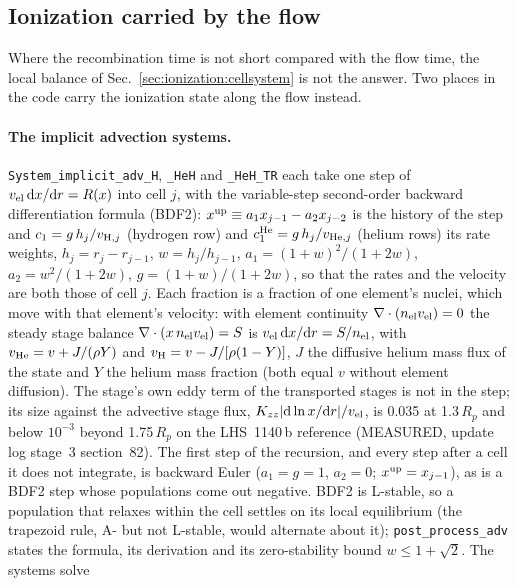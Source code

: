 \subsection{Ionization carried by the flow}
\label{sec:ionization:advected}

Where the recombination time is not short compared with the flow time, the
local balance of Sec.~\ref{sec:ionization:cellsystem} is not the answer. Two
places in the code carry the ionization state along the flow instead.

\paragraph{The implicit advection systems.} \texttt{System\_implicit\_adv\_H},
\texttt{\_HeH} and \texttt{\_HeH\_TR} each take one step of
$v_{\rm el}\,{\rm d}x/{\rm d}r = R(x)$ into cell $j$, with the
variable-step second-order backward differentiation formula (BDF2):
$x^{\rm up} \equiv a_1 x_{j-1} - a_2 x_{j-2}$ is the history of the step and
$c_1 = g\,h_j/v_{{\rm H},j}$ (hydrogen row) and
$c_1^{\rm He} = g\,h_j/v_{{\rm He},j}$ (helium rows) its rate weights,
$h_j = r_j - r_{j-1}$,
$w = h_j/h_{j-1}$, $a_1 = (1+w)^2/(1+2w)$, $a_2 = w^2/(1+2w)$,
$g = (1+w)/(1+2w)$, so that the rates and the velocity are both those of
cell $j$. Each fraction is a fraction of one element's nuclei, which move
with that element's velocity: with element continuity
$\nabla\cdot(n_{\rm el}v_{\rm el}) = 0$ the steady stage balance
$\nabla\cdot(x\,n_{\rm el}v_{\rm el}) = S$ is
$v_{\rm el}\,{\rm d}x/{\rm d}r = S/n_{\rm el}$, with
$v_{\rm He} = v + J/(\rho Y)$ and $v_{\rm H} = v - J/[\rho(1-Y)]$, $J$ the
diffusive helium mass flux of the state and $Y$ the helium mass fraction
(both equal $v$ without element diffusion). The stage's own eddy term of
the transported stages is not in the step; its size against the advective
stage flux, $K_{zz}|{\rm d}\ln x/{\rm d}r|/v_{\rm el}$, is 0.035 at
1.3\,$R_p$ and below $10^{-3}$ beyond 1.75\,$R_p$ on the LHS~1140\,b
reference (MEASURED, update log stage~3 section~82). The first step of the recursion, and every step after a cell it
does not integrate, is backward Euler ($a_1 = g = 1$, $a_2 = 0$;
$x^{\rm up} = x_{j-1}$), as is a BDF2 step whose populations come out
negative. BDF2 is L-stable, so a population that relaxes within the cell
settles on its local equilibrium (the trapezoid rule, A- but not L-stable,
would alternate about it); \texttt{post\_process\_adv} states the formula,
its derivation and its zero-stability bound $w\le1+\sqrt2$. The systems
solve
